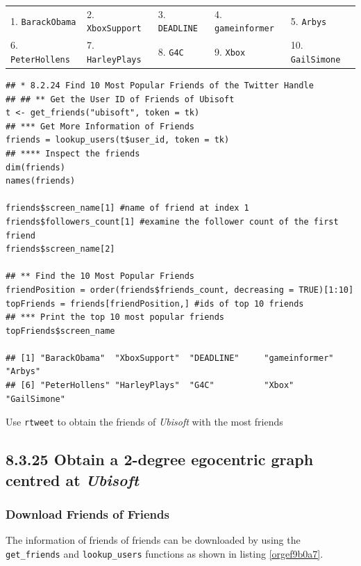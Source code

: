\documentclass[11pt]{article}
\begin{document}
\begin{center}
\begin{tabular}{lllll}
1. \texttt{BarackObama} & 2.  \texttt{XboxSupport} & 3. \texttt{DEADLINE} & 4.  \texttt{gameinformer} & 5.  \texttt{Arbys}\\
6.  \texttt{PeterHollens} & 7.  \texttt{HarleyPlays} & 8. \texttt{G4C} & 9.  \texttt{Xbox} & 10. \texttt{GailSimone}\\
\end{tabular}
\end{center}


\begin{listing}[htbp]
\begin{verbatim}
## * 8.2.24 Find 10 Most Popular Friends of the Twitter Handle
## ## ** Get the User ID of Friends of Ubisoft
t <- get_friends("ubisoft", token = tk)
## *** Get More Information of Friends
friends = lookup_users(t$user_id, token = tk)
## **** Inspect the friends
dim(friends)
names(friends)

friends$screen_name[1] #name of friend at index 1
friends$followers_count[1] #examine the follower count of the first friend
friends$screen_name[2]

## ** Find the 10 Most Popular Friends
friendPosition = order(friends$friends_count, decreasing = TRUE)[1:10]
topFriends = friends[friendPosition,] #ids of top 10 friends
## *** Print the top 10 most popular friends
topFriends$screen_name

## [1] "BarackObama"  "XboxSupport"  "DEADLINE"     "gameinformer" "Arbys"
## [6] "PeterHollens" "HarleyPlays"  "G4C"          "Xbox"         "GailSimone"
\end{verbatim}
\caption{\label{orgd8e9b41}Use \texttt{rtweet} to obtain the friends of \emph{Ubisoft} with the most friends}
\end{listing}

\subsection{8.3.25 Obtain a \textbf{2-degree} egocentric graph centred at \emph{Ubisoft}}
\label{sec:orga22baaf}
\subsubsection{Download Friends of Friends}
\label{sec:orga36b378}

The information of friends of friends can be downloaded by using the \texttt{get\_friends} and \texttt{lookup\_users}
functions as shown in listing \ref{orgef9b0a7}.
\end{document}
